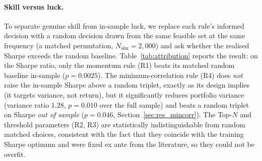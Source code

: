\paragraph{Skill versus luck.}
To separate genuine skill from in-sample luck, we replace each rule's informed
decision with a random decision drawn from the same feasible set at the same
frequency (a matched permutation, $N_{\text{sim}} = 2{,}000$) and ask whether the
realised Sharpe exceeds the random baseline. Table~\ref{tab:attribution} reports
the result: on the Sharpe ratio, only the momentum rule (R1) beats its matched
random baseline in-sample ($p = 0.0025$). The minimum-correlation rule (R4) does
\emph{not} raise the in-sample Sharpe above a random triplet, exactly as its
design implies (it targets variance, not return), but it significantly reduces
portfolio variance (variance ratio $1.28$, $p = 0.010$ over the full sample) and
beats a random triplet on Sharpe \emph{out of sample} ($p = 0.046$,
Section~\ref{sec:res_mincorr}). The Top-$N$ and threshold parameters (R2, R3) are
statistically indistinguishable from random matched choices, consistent with the
fact that they coincide with the training Sharpe optimum and were fixed ex ante from
the literature, so they could not be overfit.

